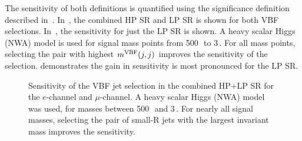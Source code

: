 The sensitivity of both definitions is quantified using the significance definition described in~\Sect{\ref{ch:opt:newlp}}. In~\Fig{\ref{fig:mjj_comb}}, the combined HP SR and LP SR is shown for both VBF selections. In~\Fig{\ref{fig:mjj_lp}}, the sensitivity for just the LP SR is shown. A heavy scalar Higgs (NWA) model is used for signal mass points from 500\,\GeV\, to 3\,\TeV. For all mass points, selecting the pair with highest $m^{\rm VBF}(j,j)$ improves the sensitivity of the selection. \Fig{\ref{fig:mjj_comb}} demonstrates the gain in sensitivity is most pronounced for the LP SR. 
\begin{figure}[htb]
\centering
{}
\caption[Sensitivity of selection method of vector boson fusion jets in the combined signal region]{Sensitivity of the VBF jet selection in the combined HP+LP SR for the \protect{} $e$-channel and \protect{} $\mu$-channel. A heavy scalar Higgs (NWA) model was used, for masses between 500\,\GeV\, and 3\,\TeV. For nearly all signal masses, selecting the pair of small-R jets with the largest invariant mass improves the sensitivity.}
\label{fig:mjj_comb}
\centering
{}

\end{figure}
